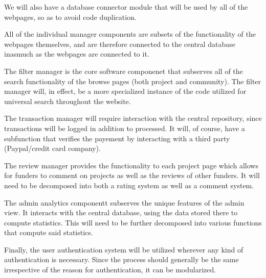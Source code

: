 \documentclass[12pt]{article}
\begin{document}
\begin{enumerate}
We will also have a database connector module that will be used by all of the webpages, so as to avoid code duplication.

All of the individual manager components are subsets of the functionality of the webpages themselves, and are therefore connected to the central database inasmuch as the webpages are connected to it.

The filter manager is the core software componenet that subserves all of the search functionality of the browse pages (both project and community). The filter manager will, in effect, be a more specialized instance of the code utilized for universal search throughout the website.

The transaction manager will require interaction with the central repository, since transactions will be logged in addition to processed. It will, of course, have a subfunction that verifies the payement by interacting with a third party (Paypal/credit card company).

The review manager provides the functionality to each project page which allows for funders to comment on projects as well as the reviews of other funders. It will need to be decomposed into both a rating system as well as a comment system.

The admin analytics componentt subserves the unique features of the admin view. It interacts with the central database, using the data stored there to compute statistics. This will need to be further decomposed into various functions that compute said statistics.

Finally, the user authentication system will be utilized wherever any kind of authentication is necessary. Since the process should generally be the same irrespective of the reason for authentication, it can be modularized.



\end{enumerate}
\end{document}
